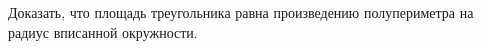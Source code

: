 \begin{ex}
	\begin{condition}
		Доказать, что площадь треугольника равна произведению полупериметра на радиус вписанной окружности.
	\end{condition}
\end{ex}